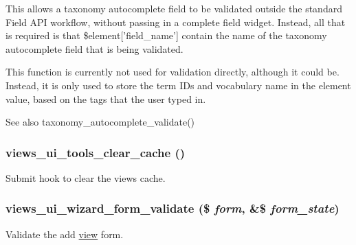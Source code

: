 This allows a taxonomy autocomplete field to be validated outside the standard Field API workflow, without passing in a complete field widget. Instead, all that is required is that \$element\mbox{[}'field\_\-name'\mbox{]} contain the name of the taxonomy autocomplete field that is being validated.

This function is currently not used for validation directly, although it could be. Instead, it is only used to store the term IDs and vocabulary name in the element value, based on the tags that the user typed in.

\begin{DoxySeeAlso}{See also}
taxonomy\_\-autocomplete\_\-validate() 
\end{DoxySeeAlso}
\hypertarget{admin_8inc_a20d738f2a5405c5fbbdbd82954bbf050}{
\subsubsection[{views\_\-ui\_\-tools\_\-clear\_\-cache}]{\setlength{\rightskip}{0pt plus 5cm}views\_\-ui\_\-tools\_\-clear\_\-cache ()}}
\label{admin_8inc_a20d738f2a5405c5fbbdbd82954bbf050}
Submit hook to clear the views cache. \hypertarget{admin_8inc_afe05234475107bed1bf649135bb7b4be}{
\subsubsection[{views\_\-ui\_\-wizard\_\-form\_\-validate}]{\setlength{\rightskip}{0pt plus 5cm}views\_\-ui\_\-wizard\_\-form\_\-validate (\$ {\em form}, \/  \&\$ {\em form\_\-state})}}
\label{admin_8inc_afe05234475107bed1bf649135bb7b4be}
Validate the add \hyperlink{classview}{view} form. 